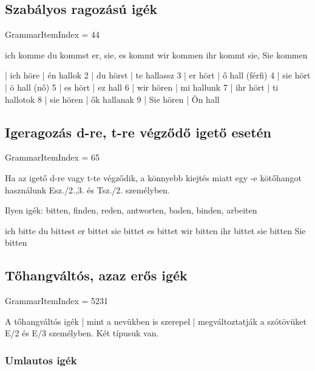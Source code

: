\documentclass{article}
\newenvironment{desc}{\verbatim}{\endverbatim}
\newenvironment{exmp}{\verbatim}{\endverbatim}
\begin{document}
\subsection{Szabályos ragozású igék}

GrammarItemIndex = 44

\begin{desc}
ich komme
du kommst
er, sie, es kommt
wir kommen
ihr kommt
sie, Sie kommen
\end{desc}

\begin{exmp}
1 | ich höre | én hallok
2 | du hörst | te hallassz
3 | er hört | ő hall (férfi)
4 | sie hört | ö hall (nő)
5 | es hört | ez hall
6 | wir hören | mi hallunk
7 | ihr hört | ti hallotok
8 | sie hören | ők hallanak
9 | Sie hören | Ön hall
\end{exmp}

\subsection{Igeragozás d-re, t-re végződő igető esetén}

GrammarItemIndex = 65

\begin{desc}
Ha az igető d-re vagy t-te végződik, a könnyebb kiejtés miatt egy -e
kötőhangot használunk Esz./2.,3. és Tsz./2. személyben.

Ilyen igék: bitten, finden, reden, antworten, baden, binden, arbeiten

ich bitte
du bittest
er bittet
sie bittet
es bittet
wir bitten
ihr bittet
sie bitten
Sie bitten
\end{desc}

\begin{exmp}
\end{exmp}

\subsection{Tőhangváltós, azaz erős igék}

GrammarItemIndex = 5231

\begin{desc}
A tőhangváltós igék | mint a nevükben is szerepel | megváltoztatják a szótövüket E/2 és E/3 személyben. Két típusuk van.
\end{desc}

\subsubsection{Umlautos igék}
\end{document}
